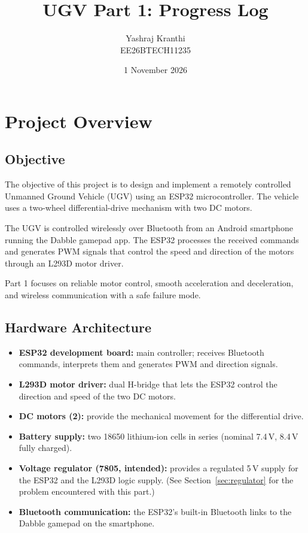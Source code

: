 \documentclass[11pt]{article}
\title{UGV Part 1: Progress Log}
\author{Yashraj Kranthi  \\
        EE26BTECH11235}
\date{1 November 2026}
\begin{document}
\maketitle
\tableofcontents
\newpage

\section{Project Overview}

\subsection{Objective}
The objective of this project is to design and implement a remotely controlled Unmanned Ground Vehicle (UGV) using an ESP32 microcontroller. The vehicle uses a two-wheel differential-drive mechanism with two DC motors.

The UGV is controlled wirelessly over Bluetooth from an Android smartphone running the Dabble gamepad app. The ESP32 processes the received commands and generates PWM signals that control the speed and direction of the motors through an L293D motor driver.

Part 1 focuses on reliable motor control, smooth acceleration and deceleration, and wireless communication with a safe failure mode.

\subsection{Hardware Architecture}
\begin{itemize}
    \item \textbf{ESP32 development board:} main controller; receives Bluetooth commands, interprets them and generates PWM and direction signals.
    \item \textbf{L293D motor driver:} dual H-bridge that lets the ESP32 control the direction and speed of the two DC motors.
    \item \textbf{DC motors (2):} provide the mechanical movement for the differential drive.
    \item \textbf{Battery supply:} two 18650 lithium-ion cells in series (nominal 7.4\,V, 8.4\,V fully charged).
    \item \textbf{Voltage regulator (7805, intended):} provides a regulated 5\,V supply for the ESP32 and the L293D logic supply. (See Section~\ref{sec:regulator} for the problem encountered with this part.)
    \item \textbf{Bluetooth communication:} the ESP32's built-in Bluetooth links to the Dabble gamepad on the smartphone.
\end{itemize}
\end{document}
